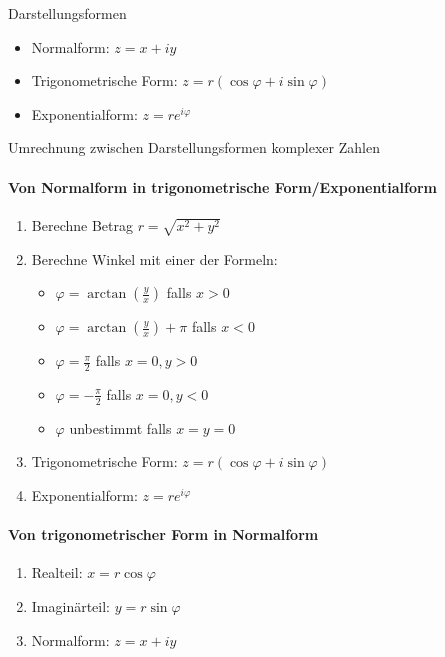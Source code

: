 \begin{concept}{Darstellungsformen}
\begin{itemize}
    \item Normalform: $z = x + iy$
    \item Trigonometrische Form: $z = r(\cos\varphi + i\sin\varphi)$
    \item Exponentialform: $z = re^{i\varphi}$
\end{itemize}
\end{concept}

\begin{KR}{Umrechnung zwischen Darstellungsformen komplexer Zahlen}
\paragraph{Von Normalform in trigonometrische Form/Exponentialform}
\begin{enumerate}
   \item Berechne Betrag $r = \sqrt{x^2 + y^2}$
   \item Berechne Winkel mit einer der Formeln: 
   \begin{itemize}
       \item $\varphi = \arctan(\frac{y}{x})$ falls $x > 0$
       \item $\varphi = \arctan(\frac{y}{x}) + \pi$ falls $x < 0$
       \item $\varphi = \frac{\pi}{2}$ falls $x = 0, y > 0$
       \item $\varphi = -\frac{\pi}{2}$ falls $x = 0, y < 0$
       \item $\varphi$ unbestimmt falls $x = y = 0$
   \end{itemize}
   \item Trigonometrische Form: $z = r(\cos\varphi + i\sin\varphi)$
   \item Exponentialform: $z = re^{i\varphi}$
\end{enumerate}

\paragraph{Von trigonometrischer Form in Normalform}
\begin{enumerate}
   \item Realteil: $x = r\cos\varphi$
   \item Imaginärteil: $y = r\sin\varphi$
   \item Normalform: $z = x + iy$
\end{enumerate}


\end{KR}
